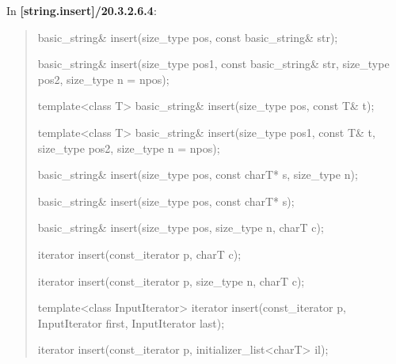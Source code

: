 \documentclass{wg21}
\begin{document}
In \textbf{[string.insert]/20.3.2.6.4}:
\begin{quote}
\begin{itemdecl}
basic_string& insert(size_type pos, const basic_string& str);
\end{itemdecl}

\begin{itemdecl}
basic_string& insert(size_type pos1, const basic_string& str, size_type pos2, size_type n = npos);
\end{itemdecl}

\begin{itemdecl}
template<class T>
  basic_string& insert(size_type pos, const T& t);
\end{itemdecl}

\begin{itemdecl}
template<class T>
  basic_string& insert(size_type pos1, const T& t, size_type pos2, size_type n = npos);
\end{itemdecl}

\begin{itemdecl}
basic_string& insert(size_type pos, const charT* s, size_type n);
\end{itemdecl}

\begin{itemdecl}
basic_string& insert(size_type pos, const charT* s);
\end{itemdecl}

\begin{itemdecl}
basic_string& insert(size_type pos, size_type n, charT c);
\end{itemdecl}

\begin{itemdecl}
iterator insert(const_iterator p, charT c);
\end{itemdecl}

\begin{itemdecl}
iterator insert(const_iterator p, size_type n, charT c);
\end{itemdecl}

\begin{itemdecl}
template<class InputIterator>
  iterator insert(const_iterator p, InputIterator first, InputIterator last);
\end{itemdecl}

\begin{itemdecl}
iterator insert(const_iterator p, initializer_list<charT> il);
\end{itemdecl}
\end{quote}
\end{document}
